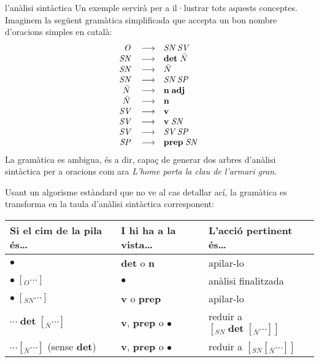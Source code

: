 \begin{persabermes}{l'anàlisi sintàctica}
  Un exemple servirà per a il·lustrar tots aquests conceptes. Imaginem
  la següent gramàtica simplificada que accepta un bon nombre
  d'oracions simples en català\label{pg:gramsenz}:
  $$
  \begin{array}{rcl}
  \mbox{\em O}\; &\longrightarrow & \mbox{\em SN}\; \mbox{\em SV}\; \\
  \mbox{\em SN}\; &\longrightarrow & \mbox{\bf det}\; \mbox{\em $\bar{N}$}\; \\
  \mbox{\em SN}\; &\longrightarrow & \mbox{\em $\bar{N}$}\; \\
  \mbox{\em SN}\; &\longrightarrow & \mbox{\em SN}\; \mbox{\em SP}\; \\
  \mbox{\em $\bar{N}$}\; &\longrightarrow & \mbox{\bf n}\; \mbox{\bf adj}\; \\
  \mbox{\em $\bar{N}$}\; &\longrightarrow & \mbox{\bf n}\; \\
  \mbox{\em SV}\; &\longrightarrow & \mbox{\bf v}\; \\
  \mbox{\em SV}\; &\longrightarrow & \mbox{\bf v}\; \mbox{\em SN}\; \\
  \mbox{\em SV}\; &\longrightarrow & \mbox{\em SV}\; \mbox{\em SP}\; \\
  \mbox{\em SP}\; &\longrightarrow & \mbox{\bf prep}\; \mbox{\em SN}\; \\
  \end{array}
  $$
  La gramàtica es ambigua, és a dir, capaç de generar dos arbres
  d'anàlisi sintàctica per a oracions com ara \emph{L'home porta la
    clau de l'armari gran}.

  Usant un algorisme estàndard que no ve al cas detallar ací, la
  gramàtica es transforma en la taula d'anàlisi sintàctica
  corresponent:

  \begin{center}
    \begin{tabular}{l|l|l}
      \hline
      \textsf{Si el cim de la pila és\ldots} & \textsf{I hi ha a la vista\ldots} & \textsf{L'acció pertinent
        és\ldots} \\
      \hline
      $\bullet$             & \textbf{det} o \textbf{n} & apilar-lo \\
      \hline
      $\bullet\; [_O \cdots ]$ & $\bullet$ & anàlisi finalitzada \\
      \hline 
      $\bullet\; [_{SN} \cdots ]$  & \textbf{v} o \textbf{prep} & apilar-lo \\

      \hline
  
      $\cdots\; \textbf{det} \; [_{\bar{N}} \cdots ]$  & \textbf{v},
      \textbf{prep} o $\bullet$ &reduir a $[_{SN}\;
      \textbf{det}\;[_{\bar{N}} \cdots ] ]$ \\
      \hline
      $\cdots [_{\bar{N}} \cdots ]$ (sense \textbf{det})  & \textbf{v}, \textbf{prep}
      o $\bullet$ & reduir a $[_{SN}
      [_{\bar{N}} \cdots ] ]$ \\


\end{tabular}
\end{center}
\end{persabermes}
